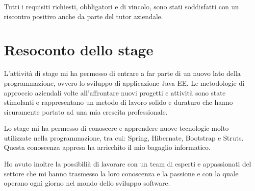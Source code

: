 \noindent Tutti i requisiti richiesti, obbligatori e di vincolo, sono stati soddisfatti con un riscontro positivo anche da parte del tutor aziendale. 

\pagebreak

\section{Resoconto dello stage}
L'attività di stage mi ha permesso di entrare a far parte di un nuovo lato della programmazione, ovvero lo sviluppo di applicazione Java EE. Le metodologie di approccio aziendali volte all'affrontare nuovi progetti e attività sono state stimolanti e rappresentano un metodo di lavoro solido e duraturo che hanno sicuramente portato ad una mia crescita professionale. 

\setlength{\parskip}{3ex}

\noindent Lo stage mi ha permesso di conoscere e apprendere nuove tecnologie molto utilizzate nella programmazione, tra cui: Spring, Hibernate, Bootstrap e Struts. Questa conoscenza appresa ha arricchito il mio bagaglio informatico.

\setlength{\parskip}{3ex}

\noindent Ho avuto inoltre la possibilià di lavorare con un team di esperti e appassionati del settore che mi hanno trasmesso la loro conoscenza e la passione e con la quale operano ogni giorno nel mondo dello sviluppo software.